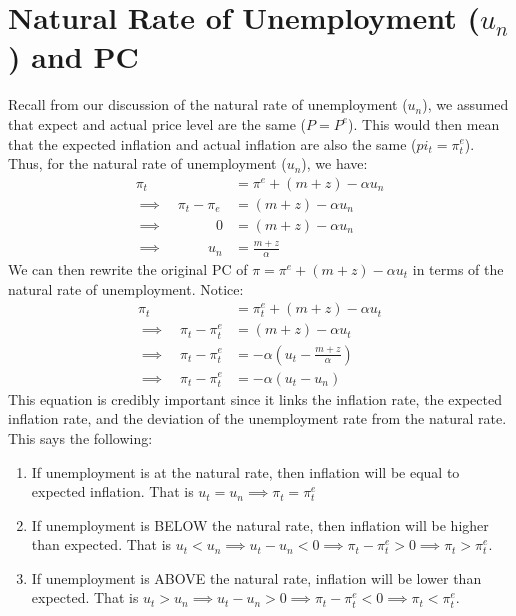 \documentclass{extarticle}
\begin{document}
\section{Natural Rate of Unemployment ($u_n$) and PC}
Recall from our discussion of the natural rate of unemployment ($u_n$), we assumed that expect and actual price level are the same ($P = P^e$). This would then mean that the expected inflation and actual inflation are also the same ($pi_t = \pi^e_t$). Thus, for the natural rate of unemployment ($u_n$), we have:
\begin{align*}
    \pi_t               &= \pi^e + (m+z) - \alpha u_n \\
    \implies \quad \pi_t - \pi_{e} &= (m+z) - \alpha u_n \\
    \implies \quad \quad \quad \; \; \, 0        &= (m+z) - \alpha u_n \\
    \implies \quad \quad \quad \, u_n &= \frac{m+z}{\alpha}
\end{align*}
We can then rewrite the original PC of $\pi = \pi^e + (m+z) - \alpha u_t$ in terms of the natural rate of unemployment. Notice:
\begin{align*}
    \pi_t               &= \pi^e_t + (m+z) - \alpha u_t \\
    \implies \quad \pi_t - \pi^e_t &= (m+z) - \alpha u_t \\
    \implies \quad \pi_t - \pi^e_t &= -\alpha(u_t - \frac{m+z}{\alpha}) \\
    \implies \quad \pi_t - \pi^e_t &= -\alpha(u_t - u_n)
\end{align*}
This equation is credibly important since it links the inflation rate, the expected inflation rate, and the deviation of the unemployment rate from the natural rate. This says the following:
\begin{enumerate}
    \item If unemployment is at the natural rate, then inflation will be equal to expected inflation. That is $u_t = u_n \implies \pi_t = \pi_t^e$
    \item If unemployment is BELOW the natural rate, then inflation will be higher than expected. That is $u_t < u_n \implies u_t - u_n < 0 \implies \pi_t - \pi_t^e > 0 \implies \pi_t > \pi_t^e$.
    \item If unemployment is ABOVE the natural rate, inflation will be lower than expected. That is $u_t > u_n \implies u_t - u_n > 0 \implies \pi_t - \pi_t^e < 0 \implies \pi_t < \pi_t^e$.
\end{enumerate}
\end{document}
